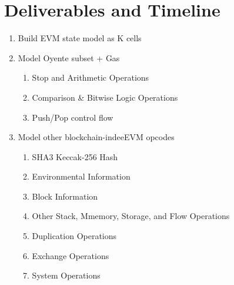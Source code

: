 \section{Deliverables and Timeline}
\begin{enumerate}
\item Build EVM state model as K cells
\item Model Oyente subset + Gas
	\begin{enumerate}	
		\item Stop and Arithmetic Operations
		\item Comparison \& Bitwise Logic Operations
		\item Push/Pop control flow 
	\end{enumerate}

\item Model other blockchain-indeeEVM opcodes
	\begin{enumerate}
		\item SHA3 Keccak-256 Hash
		\item Environmental Information
		\item Block Information
		\item Other Stack, Mmemory, Storage, and Flow Operations
		\item Duplication Operations
		\item Exchange Operations
		\item System Operations
	\end{enumerate}

\end{enumerate}
